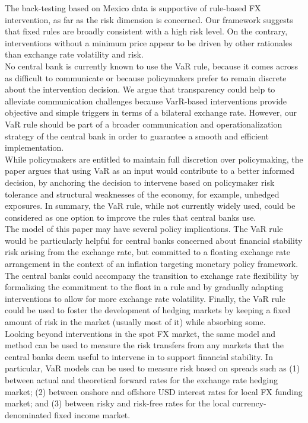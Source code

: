 \documentclass[11pt]{article}
\begin{document}
The  back-testing  based  on  Mexico  data  is  supportive  of  rule-based  FX
intervention,  as  far as  the  risk  dimension  is concerned.  Our  framework
suggests that  fixed rules are broadly  consistent with a high  risk level. On
the contrary,  interventions without a  minimum price  appear to be  driven by
other rationales than exchange rate volatility and risk.\\

No central  bank is  currently known  to use  the VaR  rule, because  it comes
across as  difficult to communicate  or because policymakers prefer  to remain
discrete about  the intervention  decision. We  argue that  transparency could
help to  alleviate communication  challenges because  VarR-based interventions
provide  objective  and simple  triggers  in  terms  of a  bilateral  exchange
rate. However,  our VaR  rule should  be part of  a broader  communication and
operationalization strategy of the central bank in order to guarantee a smooth
and efficient implementation.\\

While policymakers are entitled to maintain full discretion over policymaking,
the paper  argues that  using VaR  as an  input would  contribute to  a better
informed decision, by anchoring the decision to intervene based on policymaker
risk tolerance and structural weaknesses of the economy, for example, unhedged
exposures. In summary, the VaR rule, while not currently widely used, could be
considered as one option to improve the rules that central banks use.\\

The model  of this paper  may have several  policy implications. The  VaR rule
would  be particularly  helpful for  central banks  concerned about  financial
stability risk  arising from the  exchange rate,  but committed to  a floating
exchange rate  arrangement in the  context of an inflation  targeting monetary
policy framework. The central banks could accompany the transition to exchange
rate flexibility by formalizing  the commitment to the float in  a rule and by
gradually   adapting   interventions  to   allow   for   more  exchange   rate
volatility. Finally, the  VaR rule could be used to  foster the development of
hedging markets by keeping a fixed amount  of risk in the market (usually most
of it) while absorbing some.\\

Looking beyond interventions in the spot  FX market, the same model and method
can be used  to measure the risk  transfers from any markets  that the central
banks  deem  useful  to  intervene  in  to  support  financial  stability.  In
particular, VaR models  can be used to  measure risk based on  spreads such as
(1) between actual and theoretical forward rates for the exchange rate hedging
market;  (2) between  onshore and  offshore USD  interest rates  for local  FX
funding  market; and  (3)  between risky  and risk-free  rates  for the  local
currency-denominated fixed income market.\\
\end{document}
